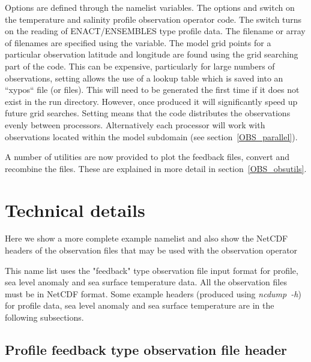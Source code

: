 Options are defined through the   namelist variables.
The options  and  switch on the temperature and salinity
profile observation operator code. The  switch turns on the reading
of ENACT/ENSEMBLES type profile data. The filename or array of filenames are
specified using the  variable. The model grid points for a
particular  observation latitude and longitude are found using the grid
searching part of the code. This can be expensive, particularly for large
numbers of observations, setting  allows the use of
a lookup table which is saved into an ``xypos`` file (or files). This will need
to be generated the first time if it does not exist in the run directory.
However, once produced it will significantly speed up future grid searches.
Setting  means that the code distributes the observations
evenly between processors. Alternatively each processor will work with
observations located within the model subdomain (see section~\ref{OBS_parallel}).

A number of utilities are now provided to plot the feedback files, convert and
recombine the files. These are explained in more detail in section~\ref{OBS_obsutils}.

\section{Technical details}
\label{OBS_details}

Here we show a more complete example namelist   and also show the NetCDF headers
of the observation
files that may be used with the observation operator


This name list uses the "feedback" type observation file input format for
profile, sea level anomaly and sea surface temperature data. All the
observation files must be in NetCDF format. Some example headers (produced using
\mbox{\textit{ncdump~-h}}) for profile
data, sea level anomaly and sea surface temperature are in the following
subsections.

\subsection{Profile feedback type observation file header}

